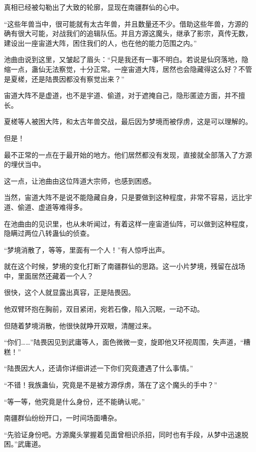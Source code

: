 
\begin{this_body}

真相已经被勾勒出了大致的轮廓，显现在南疆群仙的心中。

“这些年兽当中，很可能就有太古年兽，并且数量还不少。借助这些年兽，方源的确有很大可能，对战我们的追辑队伍。并且方源这魔头，继承了影宗，真传无数，建设出一座宙道大阵，困住我们的人，也在他的能力范围之内。”

池曲由说到这里，又皱起了眉头：“只是我还有一事不明白。若说是仙窍落地，隐缩一点，蛊仙无法察觉，十分正常。一座宙道大阵，居然也会隐藏得这么好？不管是夏槎，还是陆畏因都没有察觉出来？”

宙道大阵不是虚道，也不是宇道、偷道，对于遮掩自己，隐形匿迹方面，并不擅长。

夏槎等人被困大阵，和太古年兽交战，最后因为梦境而被俘虏，这是可以理解的。

但是！

最不正常的一点在于最开始的地方。他们居然都没有发现，直接就全部落入了方源的埋伏当中。

这一点，让池曲由这位阵道大宗师，也感到困惑。

当然，宙道大阵不是说不能隐藏自身，只是要做到这种程度，非常不容易，远比宇道、偷道、虚道等难得多。

在池曲由的见识里，也从未听闻过，有着这样一座宙道仙阵，可以做到这种程度，隐瞒过两位八转蛊仙的侦查。

“梦境消散了，等等，里面有一个人！”有人惊呼出声。

就在这个时候，梦境的变化打断了南疆群仙的思路。这一小片梦境，残留在战场中，里面居然还藏着一个人？

很快，这个人就显露出真容，正是陆畏因。

他双臂环抱在胸前，双目紧闭，宛若石像，陷入沉眠，一动不动。

但随着梦境消散，他很快就睁开双眼，清醒过来。

“你们……”陆畏因见到武庸等人，面色微微一变，旋即他又环视周围，失声道，“糟糕！”

“陆畏因大人，还请你详细讲述一下你们究竟遭遇了什么事情。”

“不错！我族蛊仙，究竟是不是被方源俘虏，落在了这个魔头的手中？”

“等一等，他究竟是什么身份，还不能确认呢。”

南疆群仙纷纷开口，一时间场面嘈杂。

“先验证身份吧。方源魔头掌握着见面曾相识杀招，同时也有手段，从梦中迅速脱困。”武庸道。


\end{this_body}
